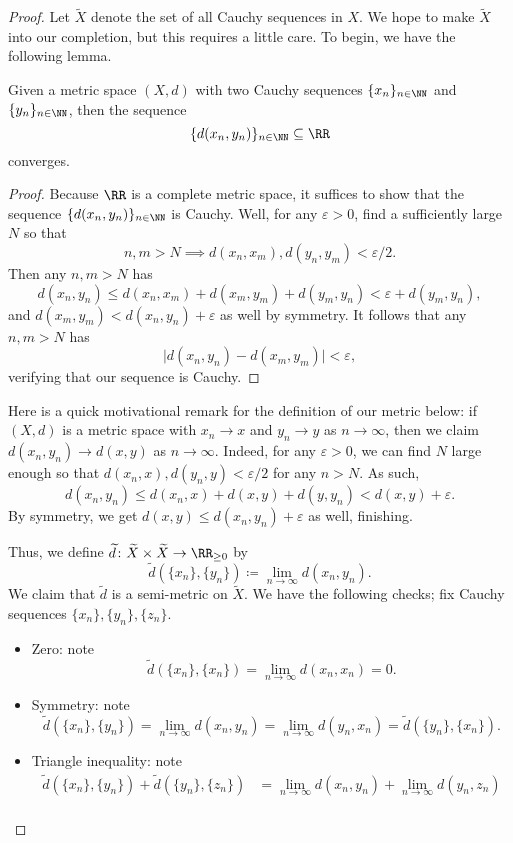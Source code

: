 \documentclass[../notes.tex]{subfiles}
\begin{document}
\begin{proof}
	Let $\widetilde X$ denote the set of all Cauchy sequences in $X$. We hope to make $\widetilde X$ into our completion, but this requires a little care. To begin, we have the following lemma.
	\begin{lemma}
		Given a metric space $(X,d)$ with two Cauchy sequences $\{x_n\}_{n\in\NN}$ and $\{y_n\}_{n\in\NN}$, then the sequence
		\[\{d(x_n,y_n)\}_{n\in\NN}\subseteq\RR\]
		converges.
	\end{lemma}
	\begin{proof}
		Because $\RR$ is a complete metric space, it suffices to show that the sequence $\{d(x_n,y_n)\}_{n\in\NN}$ is Cauchy. Well, for any $\varepsilon>0$, find a sufficiently large $N$ so that
		\[n,m>N\implies d(x_n,x_m),d(y_n,y_m)<\varepsilon/2.\]
		Then any $n,m>N$ has
		\[d(x_n,y_n)\le d(x_n,x_m)+d(x_m,y_m)+d(y_m,y_n)<\varepsilon+d(y_m,y_n),\]
		and $d(x_m,y_m)<d(x_n,y_n)+\varepsilon$ as well by symmetry. It follows that any $n,m>N$ has
		\[\big|d(x_n,y_n)-d(x_m,y_m)\big|<\varepsilon,\]
		verifying that our sequence is Cauchy.
	\end{proof}
	\begin{remark} \label{rem:metriciscont}
		Here is a quick motivational remark for the definition of our metric below: if $(X,d)$ is a metric space with $x_n\to x$ and $y_n\to y$ as $n\to\infty$, then we claim $d(x_n,y_n)\to d(x,y)$ as $n\to\infty$. Indeed, for any $\varepsilon>0$, we can find $N$ large enough so that $d(x_n,x),d(y_n,y)<\varepsilon/2$ for any $n>N$. As such,
		\[d(x_n,y_n)\le d(x_n,x)+d(x,y)+d(y,y_n)<d(x,y)+\varepsilon.\]
		By symmetry, we get $d(x,y)\le d(x_n,y_n)+\varepsilon$ as well, finishing.
	\end{remark}
	Thus, we define $\widetilde d\colon\widetilde X\times\widetilde X\to\RR_{\ge0}$ by
	\[\widetilde d\left(\{x_n\},\{y_n\}\right)\coloneqq\lim_{n\to\infty}d(x_n,y_n).\]
	We claim that $\widetilde d$ is a semi-metric on $\widetilde X$. We have the following checks; fix Cauchy sequences $\{x_n\},\{y_n\},\{z_n\}$.
	\begin{itemize}
		\item Zero: note
		\[\widetilde d(\{x_n\},\{x_n\})=\lim_{n\to\infty}d(x_n,x_n)=0.\]
		\item Symmetry: note
		\[\widetilde d(\{x_n\},\{y_n\})=\lim_{n\to\infty}d(x_n,y_n)=\lim_{n\to\infty}d(y_n,x_n)=\widetilde d(\{y_n\},\{x_n\}).\]
		\item Triangle inequality: note
		\begin{align*}
			\widetilde d(\{x_n\},\{y_n\})+\widetilde d(\{y_n\},\{z_n\}) &= \lim_{n\to\infty}d(x_n,y_n)+\lim_{n\to\infty}d(y_n,z_n) \\

\end{align*}
\end{itemize}
\end{proof}
\end{document}

